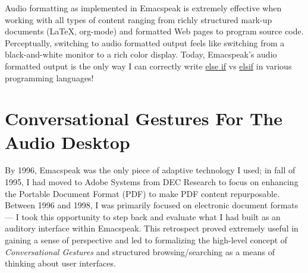 \documentclass[11pt]{article}
\begin{document}
Audio formatting as implemented in Emacspeak is extremely
effective when working with all types of content ranging from
richly structured mark-up documents (\LaTeX{}, org-mode) and
formatted Web pages to program source code. Perceptually,
switching to audio formatted output feels like switching from a
black-and-white monitor to a rich color display. Today,
Emacspeak's audio formatted output is the only way I can
correctly write \uline{else if} vs \uline{elsif} in various programming
languages!

\section{Conversational Gestures For The Audio Desktop}
\label{sec-9}

By 1996, Emacspeak was the only piece of adaptive technology I
used; in fall of 1995, I had moved to Adobe Systems from DEC
Research to focus on enhancing the Portable Document Format (PDF)
to make PDF content repurposable. Between 1996 and 1998, I was
primarily focused on electronic document formats  —   I took this
opportunity to step back and evaluate what I had built as an
auditory interface within Emacspeak. This retrospect proved
extremely useful in gaining a sense of perspective and led to
formalizing the high-level concept of \emph{Conversational Gestures}
and structured browsing/searching as a means of thinking about user interfaces.
\end{document}
